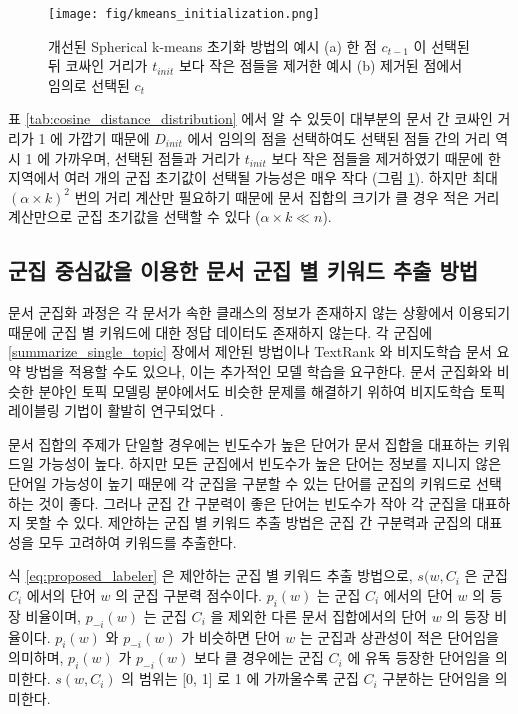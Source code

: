 \documentclass[oneside, ko,phd]{snuthesis_utf8_kor}
\begin{document}
\begin{figure}[H]
\centering
\texttt{[image: fig/kmeans\_initialization.png]}
\caption{개선된 Spherical k-means 초기화 방법의 예시 (a) 한 점 $c_{t-1}$ 이 선택된 뒤 코싸인 거리가 $t_{init}$ 보다 작은 점들을 제거한 예시 (b) 제거된 점에서 임의로 선택된 $c_t$}
\label{fig:initialization}
\end{figure}

표 \ref{tab:cosine_distance_distribution} 에서 알 수 있듯이 대부분의 문서 간 코싸인 거리가 1 에 가깝기 때문에 $D_{init}$ 에서 임의의 점을 선택하여도 선택된 점들 간의 거리 역시 1 에 가까우며, 선택된 점들과 거리가 $t_{init}$ 보다 작은 점들을 제거하였기 때문에 한 지역에서 여러 개의 군집 초기값이 선택될 가능성은 매우 작다 (그림 \ref{fig:initialization}).
하지만 최대 $(\alpha \times k)^2$ 번의 거리 계산만 필요하기 때문에 문서 집합의 크기가 클 경우 적은 거리 계산만으로 군집 초기값을 선택할 수 있다 ($\alpha \times k \ll n$).


\subsection{군집 중심값을 이용한 문서 군집 별 키워드 추출 방법}

문서 군집화 과정은 각 문서가 속한 클래스의 정보가 존재하지 않는 상황에서 이용되기 때문에 군집 별 키워드에 대한 정답 데이터도 존재하지 않는다.
각 군집에 \ref{summarize_single_topic} 장에서 제안된 방법이나 TextRank 와 비지도학습 문서 요약 방법을 적용할 수도 있으나, 이는 추가적인 모델 학습을 요구한다.
문서 군집화와 비슷한 분야인 토픽 모델링 분야에서도 비슷한 문제를 해결하기 위하여 비지도학습 토픽 레이블링 기법이 활발히 연구되었다 \cite{newman2010evaluating, sievert2014ldavis, chuang2012interpretation, snyder2013topic, chuang2012termite, blei2003latent}.

문서 집합의 주제가 단일할 경우에는 빈도수가 높은 단어가 문서 집합을 대표하는 키워드일 가능성이 높다.
하지만 모든 군집에서 빈도수가 높은 단어는 정보를 지니지 않은 단어일 가능성이 높기 때문에 각 군집을 구분할 수 있는 단어를 군집의 키워드로 선택하는 것이 좋다.
그러나 군집 간 구분력이 좋은 단어는 빈도수가 작아 각 군집을 대표하지 못할 수 있다.
제안하는 군집 별 키워드 추출 방법은 군집 간 구분력과 군집의 대표성을 모두 고려하여 키워드를 추출한다.

식 \ref{eq:proposed_labeler} 은 제안하는 군집 별 키워드 추출 방법으로, $s(w, C_i$ 은 군집 $C_i$ 에서의 단어 $w$ 의 군집 구분력 점수이다.
$p_i (w)$ 는 군집 $C_i$ 에서의 단어 $w$ 의 등장 비율이며, $p_{-i} (w)$ 는 군집 $C_i$ 을 제외한 다른 문서 집합에서의 단어 $w$ 의 등장 비율이다.
$p_i (w)$ 와 $p_{-i} (w)$ 가 비슷하면 단어 $w$ 는 군집과 상관성이 적은 단어임을 의미하며, $p_i (w)$ 가 $p_{-i} (w)$ 보다 클 경우에는 군집 $C_i$ 에 유독 등장한 단어임을 의미한다.
$s(w, C_i)$ 의 범위는 [0, 1] 로 1 에 가까울수록 군집 $C_i$ 구분하는 단어임을 의미한다.
\end{document}
